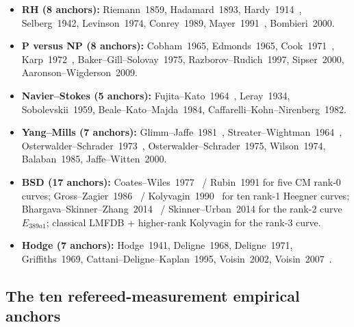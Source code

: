 \documentclass[11pt,a4paper]{amsart}
\theoremstyle{plain}
\theoremstyle{definition}
\begin{document}
\begin{itemize}[itemsep=2pt]
\item \textbf{RH (8 anchors):} Riemann~1859, Hadamard~1893, Hardy~1914~\cite{hardy1914}, Selberg~1942, Levinson~1974, Conrey~1989, Mayer~1991~\cite{mayer1991}, Bombieri~2000.
\item \textbf{P versus NP (8 anchors):} Cobham~1965, Edmonds~1965, Cook~1971~\cite{cook1971}, Karp~1972~\cite{karp1972}, Baker--Gill--Solovay~1975, Razborov--Rudich~1997, Sipser~2000, Aaronson--Wigderson~2009.
\item \textbf{Navier--Stokes (5 anchors):} Fujita--Kato~1964~\cite{fujita-kato1964}, Leray~1934, Sobolevskii~1959, Beale--Kato--Majda~1984, Caffarelli--Kohn--Nirenberg~1982.
\item \textbf{Yang--Mills (7 anchors):} Glimm--Jaffe~1981~\cite{glimm-jaffe1981}, Streater--Wightman~1964~\cite{streater-wightman1964}, Osterwalder--Schrader~1973~\cite{osterwalder-schrader1973}, Osterwalder--Schrader~1975, Wilson~1974, Balaban~1985, Jaffe--Witten~2000.
\item \textbf{BSD (17 anchors):} Coates--Wiles~1977~\cite{coates-wiles1977} / Rubin~1991 for five CM rank-0 curves; Gross--Zagier~1986~\cite{gross-zagier1986} / Kolyvagin~1990~\cite{kolyvagin1990} for ten rank-1 Heegner curves; Bhargava--Skinner--Zhang~2014~\cite{bhargava-skinner-zhang2014} / Skinner--Urban~2014 for the rank-2 curve $E_{389a1}$; classical LMFDB + higher-rank Kolyvagin for the rank-3 curve.
\item \textbf{Hodge (7 anchors):} Hodge~1941, Deligne~1968, Deligne~1971, Griffiths~1969, Cattani--Deligne--Kaplan~1995, Voisin~2002, Voisin~2007~\cite{voisin2007}.
\end{itemize}

\subsection{The ten refereed-measurement empirical anchors}
\end{document}
